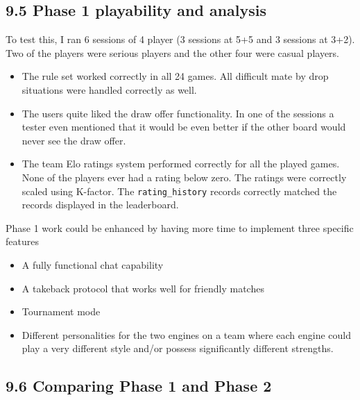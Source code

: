 \documentclass[11pt,a4paper]{article}
\begin{document}
\subsection*{9.5 Phase 1 playability and analysis}

To test this, I ran 6 sessions of 4 player (3 sessions at 5+5 and 3 sessions at 3+2). Two of the players were serious players and the other four were casual players.

\begin{itemize}

\item The rule set worked correctly in all 24 games. All difficult mate by drop situations were handled correctly as well.

\item The users quite liked the draw offer functionality. In one of the sessions a tester even mentioned that it would be even better if the other board would never see the draw offer.

\item The team Elo ratings system performed correctly for all the played games. None of the players ever had a rating below zero. The ratings were correctly scaled using K-factor. The \texttt{rating\_history} records correctly matched the records displayed in the leaderboard.

\end{itemize}

Phase 1 work could be enhanced by having more time to implement three specific features

\begin{itemize}
    \item A fully functional chat capability
    \item A takeback protocol that works well for friendly matches
    \item Tournament mode
    \item Different personalities for the two engines on a team where each engine could play a very different style and/or possess significantly different strengths.
\end{itemize}

\subsection*{9.6 Comparing Phase 1 and Phase 2}
\end{document}
